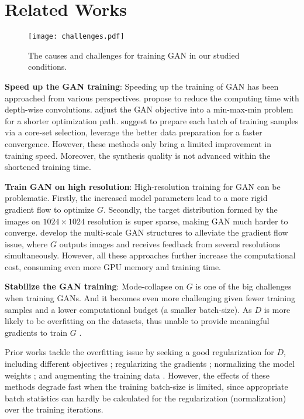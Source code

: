 \documentclass{article} \usepackage{iclr2021_conference,times}
\begin{document}
\section{Related Works}

\begin{wrapfigure}{r}{0.5\textwidth} 
\centering
    \texttt{[image: challenges.pdf]}
    \caption{The causes and challenges for training GAN in our studied conditions.}
    \label{fig:challenges}
\end{wrapfigure}

\textbf{Speed up the GAN training}: Speeding up the training of GAN has been approached from various perspectives. \citeauthor{ngxande2019depthwisegans} propose to reduce the computing time with depth-wise convolutions. \citeauthor{zhong2020improving} adjust the GAN objective into a min-max-min problem for a shorter optimization path.  \citeauthor{sinha2019small} suggest to prepare each batch of training samples via a core-set selection, leverage the better data preparation for a faster convergence. However, these methods only bring a limited improvement in training speed. Moreover, the synthesis quality is not advanced within the shortened training time.

\textbf{Train GAN on high resolution}: High-resolution training for GAN can be problematic. Firstly, the increased model parameters lead to a more rigid gradient flow to optimize $G$. Secondly, the target distribution formed by the images on $1024\times1024$ resolution is super sparse, making GAN much harder to converge. \cite{denton2015deep,zhang2017stackgan,huang2017stacked,wang2018high,karras2019style,karnewar2019msg,karras2020analyzing,liu2020time} develop the multi-scale GAN structures to alleviate the gradient flow issue, where $G$ outputs images and receives feedback from several resolutions simultaneously. However, all these approaches further increase the computational cost, consuming even more GPU memory and training time. 

\textbf{Stabilize the GAN training}: 
Mode-collapse on $G$ is one of the big challenges when training GANs. And it becomes even more challenging given fewer training samples and a lower computational budget (a smaller batch-size). As $D$ is more likely to be overfitting on the datasets, thus unable to provide meaningful gradients to train $G$ \citep{gulrajani2017improved}.

Prior works tackle the overfitting issue by seeking a good regularization for $D$, including different objectives \citep{arjovsky2017wasserstein,lim2017geometric,tran2017deep}; regularizing the gradients \citep{gulrajani2017improved,mescheder2018training}; normalizing the model weights \citep{miyato2018spectral}; and augmenting the training data \citep{karras2020training,zhao2020differentiable}. However, the effects of these methods degrade fast when the training batch-size is limited, since appropriate batch statistics can hardly be calculated for the regularization (normalization) over the training iterations. 
\end{document}
